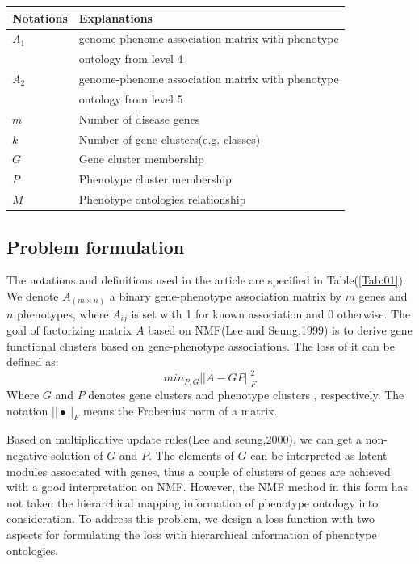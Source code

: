 \documentclass{bmcart}
\begin{document}
\begin{table}[!t]
\begin{tabular}{ll}
    \hline
    Notations & Explanations\\
    \hline\hline
    $A_1$ & genome-phenome association matrix with phenotype\\
    & ontology from level 4\\
    $A_2$ & genome-phenome association matrix with phenotype\\
    & ontology from level 5\\
    $m$ & Number of disease genes\\
    $k$ & Number of gene clusters(e.g. classes)\\
    $G$ & Gene cluster membership\\
    $P$ & Phenotype cluster membership\\
    $M$ & Phenotype ontologies relationship\\
    \hline
  \end{tabular}
\end{table}

\subsection*{Problem formulation}
The notations and definitions used in the article are specified in Table(\ref{Tab:01}).
We denote $A_{(m \times n)}$ a binary gene-phenotype association matrix by $m$ genes and $n$ phenotypes, where $A_{ij}$ is set with 1 for known association and 0 otherwise. The goal of factorizing matrix $A$ based on NMF(Lee and Seung,1999) is to derive gene functional clusters based on gene-phenotype associations. The loss of it can be defined as:
\[min _{P,G} ||A-GP||^{2}_{F}\]
Where $G$ and $P$ denotes gene clusters and phenotype clusters , respectively. The notation $||\bullet||_F$ means the Frobenius norm of a matrix.

Based on multiplicative update rules(Lee and seung,2000), we can get a non-negative solution of $G$ and $P$. The elements of $G$ can be interpreted as latent modules associated with genes, thus a couple of clusters of genes are achieved with a good interpretation on NMF.
However, the NMF method in this form has not taken the hierarchical mapping information of phenotype ontology into consideration. To address this problem, we design a loss function with two aspects for formulating the loss with hierarchical information of phenotype ontologies.
\end{document}
